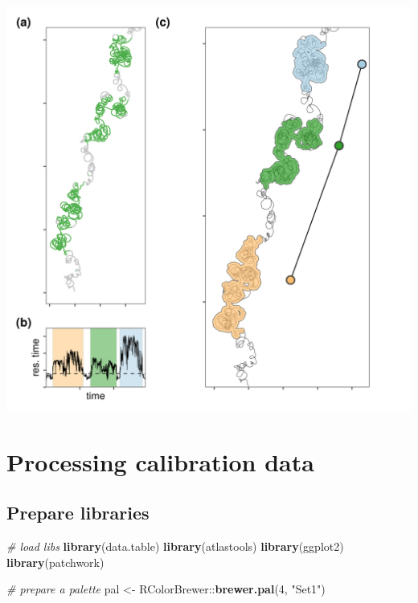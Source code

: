 \documentclass[
]{scrreprt}
\newenvironment{Shaded}{}{}
\newcommand{\CommentTok}[1]{\textcolor[rgb]{0.38,0.63,0.69}{\textit{#1}}}
\newcommand{\DecValTok}[1]{\textcolor[rgb]{0.25,0.63,0.44}{#1}}
\newcommand{\KeywordTok}[1]{\textcolor[rgb]{0.00,0.44,0.13}{\textbf{#1}}}
\newcommand{\NormalTok}[1]{#1}
\newcommand{\OperatorTok}[1]{\textcolor[rgb]{0.40,0.40,0.40}{#1}}
\newcommand{\StringTok}[1]{\textcolor[rgb]{0.25,0.44,0.63}{#1}}
\begin{document}
\includegraphics{figures/fig_residence.png}

\hypertarget{processing-calibration-data}{%
\chapter{Processing calibration data}\label{processing-calibration-data}}

\hypertarget{prepare-libraries}{%
\section{Prepare libraries}\label{prepare-libraries}}

\begin{Shaded}
\begin{Highlighting}[]
\CommentTok{\# load libs}
\KeywordTok{library}\NormalTok{(data.table)}
\KeywordTok{library}\NormalTok{(atlastools)}
\KeywordTok{library}\NormalTok{(ggplot2)}
\KeywordTok{library}\NormalTok{(patchwork)}

\CommentTok{\# prepare a palette}
\NormalTok{pal <{-}}\StringTok{ }\NormalTok{RColorBrewer}\OperatorTok{::}\KeywordTok{brewer.pal}\NormalTok{(}\DecValTok{4}\NormalTok{, }\StringTok{"Set1"}\NormalTok{)}
\end{Highlighting}
\end{Shaded}
\end{document}
